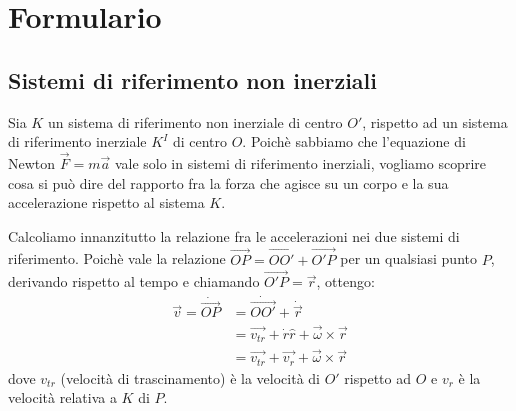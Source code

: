 \documentclass[main.tex]{subfiles}
\begin{document}
\section{Formulario}
\setcounter{equation}{0}
\renewcommand{\theequation}{F.\arabic{equation}}
\subsection{Sistemi di riferimento non inerziali}
Sia $K$ un sistema di riferimento non inerziale di centro $O'$, rispetto ad un sistema di riferimento
inerziale $K^I$ di centro $O$. Poichè sabbiamo che l'equazione di Newton $\overrightarrow{F}=m\overrightarrow{a}$
vale solo in sistemi di riferimento inerziali, vogliamo scoprire cosa si può dire del rapporto fra la forza
che agisce su un corpo e la sua accelerazione rispetto al sistema $K$.

Calcoliamo innanzitutto la relazione fra le accelerazioni nei due sistemi di riferimento. Poichè vale la
relazione $\overrightarrow{OP}=\overrightarrow{OO'}+\overrightarrow{O'P}$ per un qualsiasi punto $P$, derivando 
rispetto al tempo e chiamando $\overrightarrow{O'P}=\overrightarrow{r}$, ottengo:
\begin{equation}\label{VelNonInerziale}
\begin{split}
	\overrightarrow{v}=\dot{\overrightarrow{OP}}	& =\dot{\overrightarrow{OO'}}+\dot{\overrightarrow{r}}\\
													& =\overrightarrow{v_{tr}}+\dot{r}\hat{r}+\overrightarrow{\omega}\times\overrightarrow{r}\\
													& =\overrightarrow{v_{tr}}+\overrightarrow{v_r}+\overrightarrow{\omega}\times\overrightarrow{r}
\end{split}
\end{equation}
dove $v_{tr}$ (velocità di trascinamento) è la velocità di $O'$ rispetto ad $O$ e $v_r$ è la velocità relativa
a $K$ di $P$.
\end{document}
